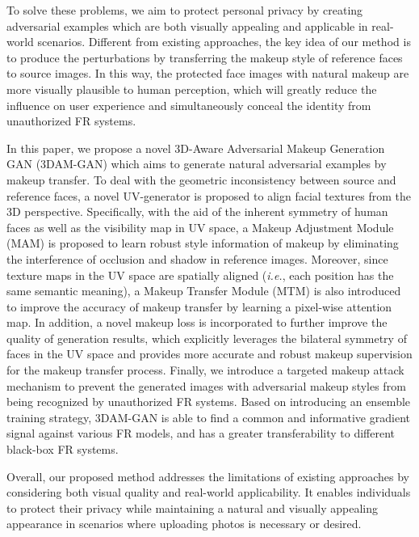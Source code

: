 \documentclass[10pt,journal,compsoc]{IEEEtran}
\begin{document}
To solve these problems, we aim to protect personal privacy by creating adversarial examples which are both visually appealing and applicable in real-world scenarios. Different from existing approaches, the key idea of our method is to produce the perturbations by transferring the makeup style of reference faces to source images. In this way, the protected face images with natural makeup are more visually plausible to human perception, which will greatly reduce the influence on user experience and simultaneously conceal the identity from unauthorized FR systems. 

In this paper, we propose a novel 3D-Aware Adversarial Makeup Generation GAN (3DAM-GAN) which aims to generate natural adversarial examples by makeup transfer. To deal with the geometric inconsistency between source and reference faces, a novel UV-generator is proposed to align facial textures from the 3D perspective. Specifically, with the aid of the inherent symmetry of human faces as well as the visibility map in UV space, a Makeup Adjustment Module (MAM) is proposed to learn robust style information of makeup by eliminating the interference of occlusion and shadow in reference images. Moreover, since texture maps in the UV space are spatially aligned (\emph{i.e.}, each position has the same semantic meaning), a Makeup Transfer Module (MTM) is also introduced to improve the accuracy of makeup transfer by learning a pixel-wise attention map. In addition, a novel makeup loss is incorporated to further improve the quality of generation results, which explicitly leverages the bilateral symmetry of faces in the UV space and provides more accurate and robust makeup supervision for the makeup transfer process. Finally, we introduce a targeted makeup attack mechanism to prevent the generated images with adversarial makeup styles from being recognized by unauthorized FR systems. Based on introducing an ensemble training strategy, 3DAM-GAN is able to find a common and informative gradient signal against various FR models, and has a greater transferability to different black-box FR systems.

Overall, our proposed method addresses the limitations of existing approaches by considering both visual quality and real-world applicability. It enables individuals to protect their privacy while maintaining a natural and visually appealing appearance in scenarios where uploading photos is necessary or desired.
\end{document}
